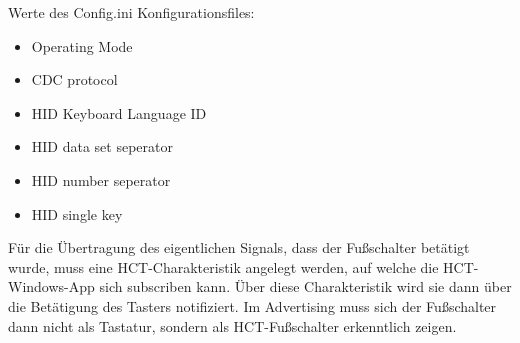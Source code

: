 Werte des Config.ini Konfigurationsfiles:
\begin{itemize}
	\item Operating Mode 
	\item CDC protocol 
	\item HID Keyboard Language ID 
	\item HID data set seperator 
	\item HID number seperator
	\item HID single key 
\end{itemize}

Für die Übertragung des eigentlichen Signals, dass der Fußschalter betätigt wurde, muss eine HCT-Charakteristik angelegt werden, auf welche die HCT-Windows-App sich subscriben kann. Über diese Charakteristik wird sie dann über die Betätigung des Tasters notifiziert. Im Advertising muss sich der Fußschalter dann nicht als Tastatur, sondern als HCT-Fußschalter erkenntlich zeigen.